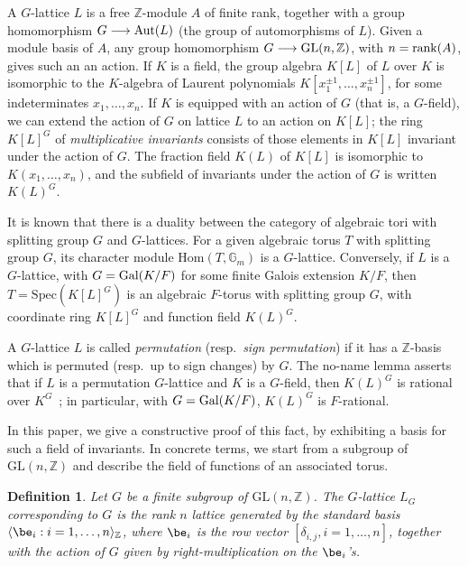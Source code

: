 \documentclass[12pt]{article}
\theoremstyle{plain}
\newtheorem{definition}[theorem]{Definition}
\newcommand{\Z}{\ensuremath{\mathbb{Z}}}
\begin{document}
A $G$-lattice $L$ is a free $\Z$-module $A$ of finite rank, together
with a group homomorphism $G \longrightarrow {\rm Aut}(L)$ (the group
of automorphisms of $L$). Given a module basis of $A$, any group
homomorphism $G \longrightarrow {\rm GL}(n,\Z)$, with $n={\rm
  rank}(A)$, gives such an an action.  If $K$ is a field, the group
algebra $K[L]$ of $L$ over $K$ is isomorphic to the $K$-algebra of
Laurent polynomials $K[x_1^{\pm 1},\dots,x_n^{\pm 1}]$, for some
indeterminates $x_1,\dots,x_n$.  If $K$ is equipped with an action of
$G$ (that is, a $G$-field), we can extend the action of $G$ on lattice
$L$ to an action on $K[L]$; the ring $K[L]^G$ of {\em multiplicative
  invariants} consists of those elements in $K[L]$ invariant under the
action of $G$. The fraction field $K(L)$ of $K[L]$ is isomorphic to
$K(x_1,\dots,x_n)$, and the subfield of invariants under the action of
$G$ is written $K(L)^G$.

It is known that there is a duality between the category of algebraic
tori with splitting group $G$ and $G$-lattices. For a given algebraic
torus $T$ with splitting group $G$, its character module
$\mathrm{Hom}(T,\mathbb{G}_m)$ is a $G$-lattice. Conversely, if $L$ is
a $G$-lattice, with $G={\rm Gal}(K/F)$ for some finite Galois
extension $K/F$, then $T=\mathrm{Spec}(K[L]^G)$ is an algebraic
$F$-torus with splitting group $G$, with coordinate ring $K[L]^G$ and
function field $K(L)^G$.

A $G$-lattice $L$ is called {\em permutation} (resp.\ {\em sign
  permutation}) if it has a $\Z$-basis which is permuted (resp.\ up to
sign changes) by $G$. The no-name lemma asserts that if $L$ is a
permutation $G$-lattice and $K$ is a $G$-field, then $K(L)^G$ is
rational over $K^G$~\cite[Chapter~9.4]{Lorenz}; in particular, with
$G={\rm Gal}(K/F)$, $K(L)^G$ is $F$-rational.

In this paper, we give a constructive proof of this fact, by
exhibiting a basis for such a field of invariants.  In concrete terms,
we start from a subgroup of $\mathrm{GL}(n,\Z)$ and describe the field
of functions of an associated torus.

\begin{definition}\label{Assumption}
  Let $G$ be a finite subgroup of $\mathrm{GL}(n,\Z)$.  The
  $G$-lattice $L_G$ corresponding to $G$ is the rank $n$ lattice
  generated by the standard basis $\langle \be_i : i = 1,
  \ldots, n \rangle_\Z$, where $\be_i$ is the row vector
  $[\delta_{i,j}, i=1,\dots,n]$, together with the action of $G$ given
  by right-multiplication on the $\be_i$'s.
\end{definition}
\end{document}

